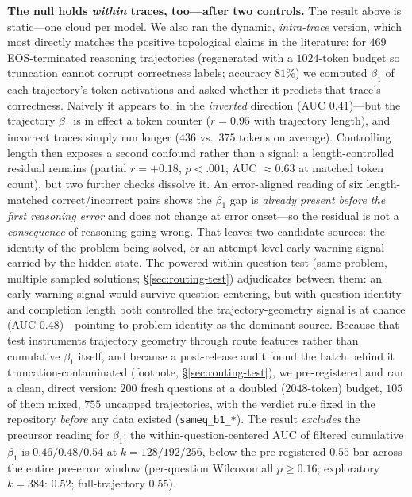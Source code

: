 \documentclass{article}
\begin{document}
\medskip
\noindent\textbf{The null holds \emph{within} traces, too---after two controls.} The result above is
static---one cloud per model. We also ran the dynamic, \emph{intra-trace} version, which most directly
matches the positive topological claims in the literature: for $469$ EOS-terminated reasoning
trajectories (regenerated with a $1024$-token budget so truncation cannot corrupt correctness labels;
accuracy $81\%$) we computed $\beta_1$ of each trajectory's token activations and asked whether it
predicts that trace's correctness. Naively it appears to, in the \emph{inverted} direction (AUC
$0.41$)---but the trajectory $\beta_1$ is in effect a token counter ($r = 0.95$ with trajectory
length), and incorrect traces simply run longer ($436$ vs.\ $375$ tokens on average). Controlling
length then exposes a second confound rather than a signal: a length-controlled residual remains
(partial $r = +0.18$, $p<.001$; AUC $\approx 0.63$ at matched token count), but two further checks
dissolve it. An error-aligned reading of six length-matched correct/incorrect pairs shows the
$\beta_1$ gap is \emph{already present before the first reasoning error} and does not change at
error onset---so the residual is not a \emph{consequence} of reasoning going wrong. That leaves two
candidate sources: the identity of the problem being solved, or an attempt-level early-warning
signal carried by the hidden state. The powered within-question test (same problem, multiple
sampled solutions; \S\ref{sec:routing-test}) adjudicates between them: an early-warning signal
would survive question centering, but with question identity and completion length both controlled
the trajectory-geometry signal is at chance (AUC $0.48$)---pointing to problem identity as the
dominant source. Because that test instruments trajectory geometry through route features rather
than cumulative $\beta_1$ itself, and because a post-release audit found the batch behind it
truncation-contaminated (footnote, \S\ref{sec:routing-test}), we pre-registered and ran a clean,
direct version: $200$ fresh questions at a doubled ($2048$-token) budget, $105$ of them mixed,
$755$ uncapped trajectories, with the verdict rule fixed in the repository \emph{before} any data
existed (\texttt{sameq\_b1\_*}). The result \emph{excludes} the precursor reading for $\beta_1$:
the within-question-centered AUC of filtered cumulative $\beta_1$ is $0.46/0.48/0.54$ at
$k=128/192/256$, below the pre-registered $0.55$ bar across the entire pre-error window
(per-question Wilcoxon all $p \geq 0.16$; exploratory $k=384$: $0.52$; full-trajectory $0.55$).
\end{document}
